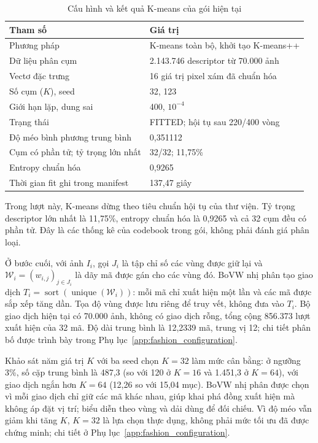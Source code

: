 \begin{table}[!t]
    \centering
    \caption{Cấu hình và kết quả K-means của gói hiện tại}
    \label{tab:kmeans_configuration}
    \footnotesize
    \setlength{\tabcolsep}{3pt}
    \begin{tabular}{@{}p{} p{}@{}}
        \hline
        \textbf{Tham số} & \textbf{Giá trị} \\
        \hline
        Phương pháp & K-means toàn bộ, khởi tạo K-means++ \\
        Dữ liệu phân cụm & 2.143.746 descriptor từ 70.000 ảnh \\
        Vectơ đặc trưng & 16 giá trị pixel xám đã chuẩn hóa \\
        Số cụm ($K$), seed & 32, 123 \\
        Giới hạn lặp, dung sai & 400, $10^{-4}$ \\
        Trạng thái & FITTED; hội tụ sau 220/400 vòng \\
        Độ méo bình phương trung bình & 0,351112 \\
        Cụm có phần tử; tỷ trọng lớn nhất & 32/32; 11,75\% \\
        Entropy chuẩn hóa & 0,9265 \\
        Thời gian fit ghi trong manifest & 137,47 giây \\
        \hline
    \end{tabular}
\end{table}

Trong lượt này, K-means dừng theo tiêu chuẩn hội tụ của thư viện. Tỷ trọng descriptor lớn nhất là 11,75\%, entropy chuẩn hóa là 0,9265 và cả 32 cụm đều có phần tử. Đây là các thống kê của codebook trong gói, không phải đánh giá phân loại.

Ở bước cuối, với ảnh $I_i$, gọi $J_i$ là tập chỉ số các vùng được giữ lại và $\mathcal{W}_i=(w_{i,j})_{j\in J_i}$ là dãy mã được gán cho các vùng đó. BoVW nhị phân tạo giao dịch $T_i=\operatorname{sort}(\operatorname{unique}(\mathcal{W}_i))$: mỗi mã chỉ xuất hiện một lần và các mã được sắp xếp tăng dần. Tọa độ vùng được lưu riêng để truy vết, không đưa vào $T_i$. Bộ giao dịch hiện tại có 70.000 ảnh, không có giao dịch rỗng, tổng cộng 856.373 lượt xuất hiện của 32 mã. Độ dài trung bình là 12,2339 mã, trung vị 12; chi tiết phân bố được trình bày trong Phụ lục~\ref{app:fashion_configuration}.

Khảo sát năm giá trị $K$ với ba seed chọn $K=32$ làm mức cân bằng: ở ngưỡng 3\%, số cặp trung bình là 487,3 (so với 120 ở $K=16$ và 1.451,3 ở $K=64$), với giao dịch ngắn hơn $K=64$ (12,26 so với 15,04 mục). BoVW nhị phân được chọn vì mỗi giao dịch chỉ giữ các mã khác nhau, giúp khai phá đồng xuất hiện mà không áp đặt vị trí; biểu diễn theo vùng và dải dùng để đối chiếu. Vì độ méo vẫn giảm khi tăng $K$, $K=32$ là lựa chọn thực dụng, không phải mức tối ưu đã được chứng minh; chi tiết ở Phụ lục~\ref{app:fashion_configuration}.

